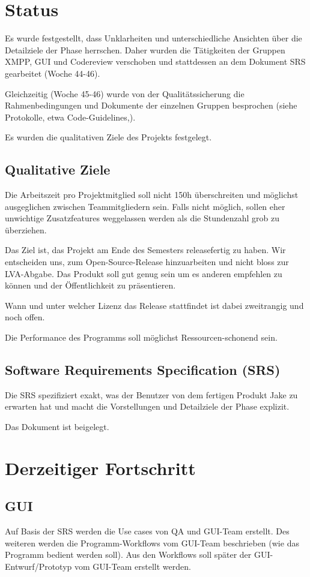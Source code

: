 \setcounter{chapter}{1}
\section{Status}
Es wurde festgestellt, dass Unklarheiten und unterschiedliche Ansichten über 
die Detailziele der Phase herrschen. Daher wurden die Tätigkeiten der 
Gruppen XMPP, GUI und Codereview verschoben und stattdessen an dem Dokument 
SRS gearbeitet (Woche 44-46).

Gleichzeitig (Woche 45-46) wurde von der Qualitätssicherung die 
Rahmenbedingungen und Dokumente der einzelnen Gruppen besprochen (siehe 
Protokolle, etwa Code-Guidelines,).

Es wurden die qualitativen Ziele des Projekts festgelegt.

\subsection{Qualitative Ziele}
Die Arbeitszeit pro Projektmitglied soll nicht 150h überschreiten und 
möglichst ausgeglichen zwischen Teammitgliedern sein. Falls nicht möglich, 
sollen eher unwichtige Zusatzfeatures weggelassen werden als die Stundenzahl 
grob zu überziehen.

Das Ziel ist, das Projekt am Ende des Semesters releasefertig zu haben. Wir 
entscheiden uns, zum Open-Source-Release hinzuarbeiten und nicht bloss zur 
LVA-Abgabe. Das Produkt soll gut genug sein um es anderen empfehlen zu 
können und der Öffentlichkeit zu präsentieren.

Wann und unter welcher Lizenz das Release stattfindet ist dabei zweitrangig 
und noch offen.

Die Performance des Programms soll möglichst Ressourcen-schonend sein.

\subsection{Software Requirements Specification (SRS)}
Die SRS spezifiziert exakt, was der Benutzer von dem fertigen Produkt Jake zu 
erwarten hat und macht die Vorstellungen und Detailziele der Phase explizit.

Das Dokument ist beigelegt.

\section{Derzeitiger Fortschritt}
\subsection{GUI}
Auf Basis der SRS werden die Use cases von QA und GUI-Team erstellt. Des 
weiteren werden die Programm-Workflows vom GUI-Team beschrieben (wie das 
Programm bedient werden soll). 
Aus den Workflows soll später der GUI-Entwurf/Prototyp vom GUI-Team erstellt
 werden.

